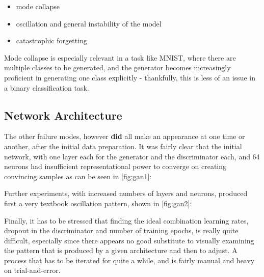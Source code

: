 \begin{itemize}
	\item mode collapse \cite{mode_collapse}
	\item oscillation and general instability of the model \cite{gan_continual_learning}
	\item catastrophic forgetting \cite{catastrophic_forgetting}
\end{itemize}

Mode collapse is especially relevant in a task like MNIST, where there are multiple classes to be generated, and the generator becomes increasingly proficient in generating one class explicitly - thankfully, this is less of an issue in a binary classification task.

\subsection{Network Architecture}

The other failure modes, however \textbf{did} all make an appearance at one time or another, after the initial data preparation. It was fairly clear that the initial network, with one layer each for the generator and the discriminator each, and 64 neurons had insufficient representational power to converge on creating convincing samples as can be seen in \ref{fig:gan1}:


\pagebreak 

Further experiments, with increased numbers of layers and neurons, produced first a very textbook oscillation pattern, shown in \ref{fig:gan2}:
 

\pagebreak 

Finally, it has to be stressed that finding the ideal combination learning rates, dropout in the discriminator and number of training epochs, is really quite difficult, especially since there appears no good substitute to visually examining the pattern that is produced by a given architecture and then to adjust. A process that has to be iterated for quite a while, and is fairly manual and heavy on trial-and-error.
 
